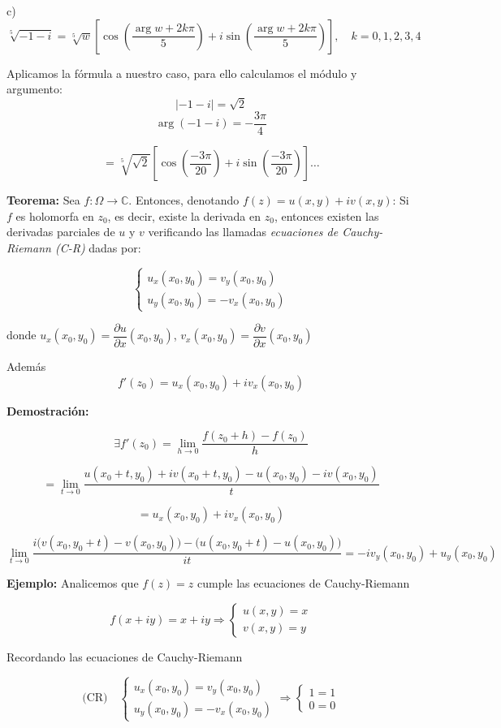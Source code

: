 \documentclass[a4paper,12pt]{article}
\begin{document}
\noindent c) 
\[
\sqrt[5]{-1 - i} = \sqrt[5]{w} \left[ \cos\left( \frac{\arg w + 2k\pi}{5} \right) + i \sin\left( \frac{\arg w + 2k\pi}{5} \right) \right], \quad k = 0, 1, 2, 3, 4
\]

Aplicamos la fórmula a nuestro caso, para ello calculamos el módulo y argumento:
\[
|-1 - i| = \sqrt{2}
\]
\[
\arg(-1 - i) = -\frac{3\pi}{4}
\]

\[
= \sqrt[5]{\sqrt{2}} \left[ \cos\left( \frac{-3\pi}{20} \right) + i \sin\left( \frac{-3\pi}{20} \right) \right] \ldots
\]

\textbf{Teorema:} Sea $f: \Omega \rightarrow \mathbb{C}$. Entonces, denotando $f(z) = u(x, y) + iv(x, y)$:  
Si $f$ es holomorfa en $z_0$, es decir, existe la derivada en $z_0$, entonces existen las derivadas parciales de $u$ y $v$ verificando las llamadas \textit{ecuaciones de Cauchy-Riemann (C-R)} dadas por:

\[
\begin{cases}
u_x(x_0, y_0) = v_y(x_0, y_0) \\
u_y(x_0, y_0) = -v_x(x_0, y_0)
\end{cases}
\]

donde $u_x(x_0, y_0) = \dfrac{\partial u}{\partial x}(x_0, y_0)$, $v_x(x_0, y_0) = \dfrac{\partial v}{\partial x}(x_0, y_0)$

Además
\[
f'(z_0) = u_x(x_0, y_0) + i v_x(x_0, y_0)
\]

\textbf{Demostración:}

\[
\exists f'(z_0) = \lim_{h \to 0} \frac{f(z_0 + h) - f(z_0)}{h}
\]

\[
= \lim_{t \to 0} \frac{u(x_0 + t, y_0) + i v(x_0 + t, y_0) - u(x_0, y_0) - i v(x_0, y_0)}{t}
\]

\[
= u_x(x_0, y_0) + i v_x(x_0, y_0)
\]

\[
\lim_{t \to 0} \frac{i \big( v(x_0, y_0 + t) - v(x_0, y_0) \big) - \big( u(x_0, y_0 + t) - u(x_0, y_0) \big)}{it} = -i v_y(x_0, y_0) + u_y(x_0, y_0)
\]

\noindent\textbf{Ejemplo:} Analicemos que $f(z) = z$ cumple las ecuaciones de Cauchy-Riemann

\[
f(x + iy) = x + iy \Rightarrow
\begin{cases}
u(x, y) = x \\
v(x, y) = y
\end{cases}
\]

Recordando las ecuaciones de Cauchy-Riemann

\[
\text{(CR)} \quad
\begin{cases}
u_x(x_0, y_0) = v_y(x_0, y_0) \\
u_y(x_0, y_0) = -v_x(x_0, y_0)
\end{cases}
\Rightarrow
\begin{cases}
1 = 1 \\
0 = 0
\end{cases}
\]
\end{document}

